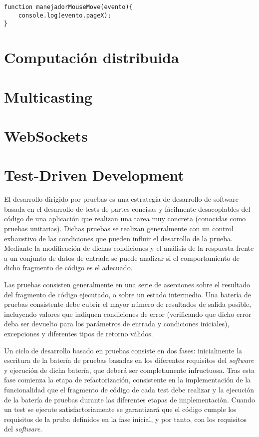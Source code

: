 \begin{lstlisting}
function manejadorMouseMove(evento){
	console.log(evento.pageX);
}
\end{lstlisting}

\section{Computación distribuida}

\section{Multicasting}

\section{WebSockets}

\section{Test-Driven Development}

El desarrollo dirigido por pruebas es una estrategia de desarrollo de software basada en el desarrollo de tests de partes concisas y fácilmente desacoplables del código de una aplicación que realizan una tarea muy concreta (conocidas como pruebas unitarias). Dichas pruebas se realizan generalmente con un control exhaustivo de las condiciones que pueden influir el desarrollo de la prueba. Mediante la modificación de dichas condiciones y el análisis de la respuesta frente a un conjunto de datos de entrada se puede analizar si el comportamiento de dicho fragmento de código es el adecuado.

Las pruebas consisten generalmente en una serie de aserciones sobre el resultado del fragmento de código ejecutado, o sobre un estado intermedio. Una batería de pruebas consistente debe cubrir el mayor número de resultados de salida posible, incluyendo valores que indiquen condiciones de error (verificando que dicho error deba ser devuelto para los parámetros de entrada y condiciones iniciales), excepciones y diferentes tipos de retorno válidos.

Un ciclo de desarrollo basado en pruebas consiste en dos fases: inicialmente la escritura de la batería de pruebas basadas en los diferentes requisitos del \textit{software} y ejecución de dicha batería, que deberá ser completamente infructuosa. Tras esta fase comienza la etapa de refactorización, consistente en la implementación de la funcionalidad que el fragmento de código de cada test debe realizar y la ejecución de la batería de pruebas durante las diferentes etapas de implementación. Cuando un test se ejecute satisfactoriamente se garantizará que el código cumple los requisitos de la pruba definidos en la fase inicial, y por tanto, con los requisitos del \textit{software}.

